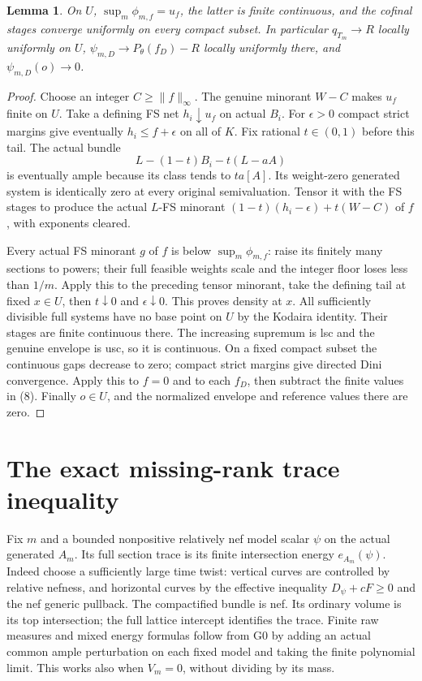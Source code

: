 \documentclass[11pt]{article}
\newtheorem{lemma}[theorem]{Lemma}
\begin{document}
\begin{lemma}\label{density}
On $U$, $\sup_m\phi_{m,f}=u_f$, the latter is finite continuous,
and the cofinal stages converge uniformly on every compact subset.
In particular $q_{T_m}\to R$ locally uniformly on $U$,
$\psi_{m,D}\to P_\theta(f_D)-R$ locally uniformly there,
and $\psi_{m,D}(o)\to0$.
\end{lemma}
\begin{proof}
Choose an integer $C\geq\|f\|_\infty$.
The genuine minorant $W-C$ makes $u_f$ finite on $U$.
Take a defining FS net $h_i\downarrow u_f$ on actual $B_i$.
For $\epsilon>0$ compact strict margins give eventually
$h_i\leq f+\epsilon$ on all of $K$.
Fix rational $t\in(0,1)$ before this tail. The actual bundle
\[
                   L-(1-t)B_i-t(L-aA)
\]
is eventually ample because its class tends to $ta[A]$.
Its weight-zero generated system is identically zero at every
original semivaluation. Tensor it with the FS stages to produce
the actual $L$-FS minorant
$(1-t)(h_i-\epsilon)+t(W-C)$ of $f$, with exponents cleared.

Every actual FS minorant $g$ of $f$ is below $\sup_m\phi_{m,f}$:
raise its finitely many sections to powers; their full feasible
weights scale and the integer floor loses less than $1/m$.
Apply this to the preceding tensor minorant, take the defining
tail at fixed $x\in U$, then $t\downarrow0$ and
$\epsilon\downarrow0$. This proves density at $x$.
All sufficiently divisible full systems have no base point on $U$
by the Kodaira identity. Their stages are finite continuous there.
The increasing supremum is lsc and the genuine envelope is usc,
so it is continuous. On a fixed compact subset the continuous
gaps decrease to zero; compact strict margins give directed Dini
convergence. Apply this to $f=0$ and to each $f_D$, then subtract
the finite values in (8). Finally $o\in U$, and the normalized
envelope and reference values there are zero.
\end{proof}

\section{The exact missing-rank trace inequality}\label{trace}
Fix $m$ and a bounded nonpositive relatively nef model scalar
$\psi$ on the actual generated $A_m$. Its full section trace
is its finite intersection energy $e_{A_m}(\psi)$.
Indeed choose a sufficiently large time twist: vertical curves
are controlled by relative nefness, and horizontal curves by
the effective inequality $D_\psi+cF\geq0$ and the nef generic
pullback. The compactified bundle is nef. Its ordinary volume
is its top intersection; the full lattice intercept identifies
the trace. Finite raw measures and mixed energy formulas follow
from G0 by adding an actual common ample perturbation on each
fixed model and taking the finite polynomial limit. This works
also when $V_m=0$, without dividing by its mass.
\end{document}
